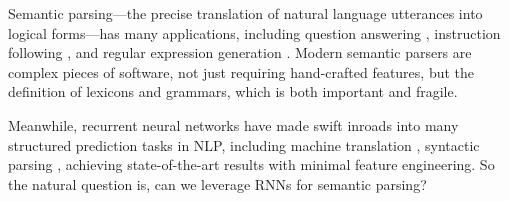 \documentclass[11pt,letterpaper]{article}
\newcommand\pl[1]{}
\newcommand\rj[1]{}
\begin{document}
Semantic parsing---the precise translation of natural language utterances into 
logical forms---has many applications,
including question answering \cite{zelle96geoquery,zettlemoyer05ccg,zettlemoyer07relaxed,liang11dcs,artzi2013weakly,berant2013freebase},
instruction following \cite{artzi2013weakly},
and regular expression generation \cite{kushman2013regex}.
Modern semantic parsers \cite{artzi2013uw,berant2013freebase} are complex pieces of software,
not just requiring hand-crafted features,
but the definition of lexicons and grammars,
which is both important and fragile.


Meanwhile, recurrent neural networks have made swift inroads into 
many structured prediction tasks in NLP,
including machine translation
\cite{sutskever2014sequence,bahdanau2014neural}, 
syntactic parsing \cite{vinyals2015grammar,dyer2015transition},
achieving state-of-the-art results with minimal feature engineering.
So the natural question is, can we leverage RNNs for semantic parsing?

\end{document}
